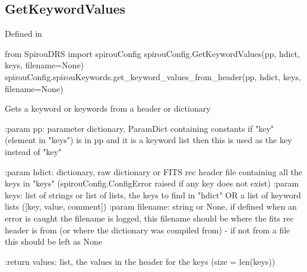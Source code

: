 \noindent\begin{minipage}{\textwidth}
\subsection{GetKeywordValues}

Defined in \spirouConfig{}

\begin{pythonbox}
from SpirouDRS import spirouConfig
spirouConfig.GetKeywordValues(pp, hdict, keys, filename=None)
spirouConfig.spirouKeywords.get_keyword_values_from_header(pp, hdict, keys, filename=None)
\end{pythonbox}

\begin{pythondocstring}
Gets a keyword or keywords from a header or dictionary

:param pp: parameter dictionary, ParamDict containing constants
            if "key" (element in "keys") is in pp and it is a
            keyword list then this is used as the key instead of "key"

:param hdict: dictionary, raw dictionary or FITS rec header file containing
              all the keys in "keys" (spirouConfig.ConfigError raised if
              any key does not exist)
:param keys: list of strings or list of lists, the keys to find in "hdict"
             OR a list of keyword lists ([key, value, comment])
:param filename: string or None, if defined when an error is caught the
                 filename is logged, this filename should be where the
                 fits rec header is from (or where the dictionary was
                 compiled from) - if not from a file this should be left
                 as None

:return values: list, the values in the header for the keys
                (size = len(keys))
\end{pythondocstring}
\end{minipage}

